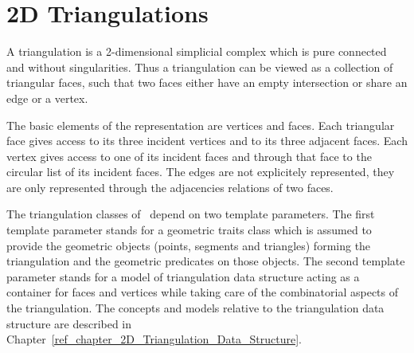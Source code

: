 
\chapter{2D Triangulations}
\label{ref_chapter_2D_Triangulations}

A triangulation is a 2-dimensional simplicial complex which is pure
connected and without singularities. Thus a triangulation
can be viewed as a collection of triangular faces,
such that two faces either have an empty intersection or share an edge or a vertex.

The basic elements of the representation are vertices and faces.
Each triangular face gives access to its three incident vertices 
and to its three adjacent faces. 
Each vertex gives access to one of its incident faces
and through that face to the circular list of its incident faces.
The edges are not explicitely represented, they are only represented 
through the adjacencies relations of two faces.

The triangulation classes of \cgal\ depend on two template parameters.
The first template parameter stands for
 a geometric traits class which is assumed to provide
the geometric objects (points, segments and triangles) 
forming  the triangulation and the geometric predicates on those objects.
The second template parameter stands for a model
of  triangulation data
structure acting as a container for faces and vertices
while  taking care of the combinatorial aspects of the triangulation. 
The concepts and models relative to the triangulation data structure
are described in
Chapter~\ref{ref_chapter_2D_Triangulation_Data_Structure}.

